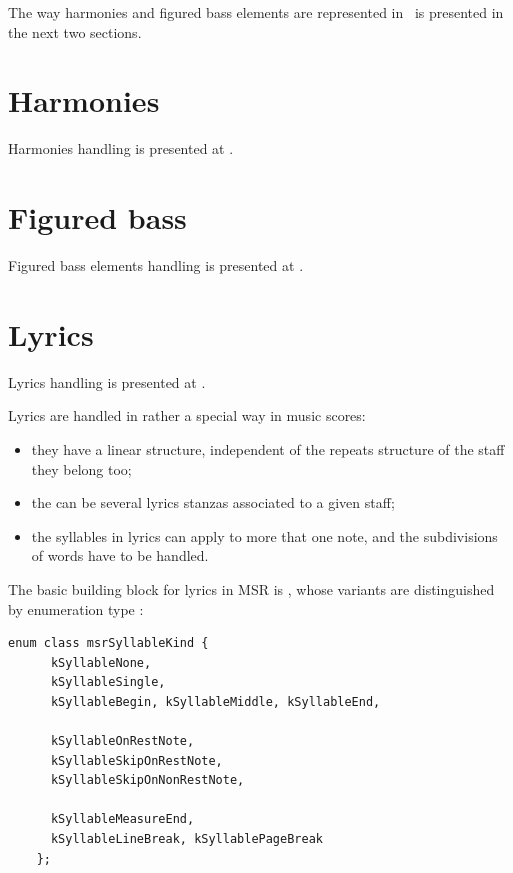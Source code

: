 The way harmonies and figured bass elements are represented in \mf\ is presented in the next two sections.


\section{Harmonies}\label{Harmonies}

Harmonies handling is presented at .


\section{Figured bass}\label{Figured bass}

Figured bass elements handling is presented at .


\section{Lyrics}\label{Lyrics}

Lyrics handling is presented at .

Lyrics are handled in rather a special way in music scores:
\begin{itemize}
\item they have a linear structure, independent of the repeats structure of the staff they belong too;
\item the can be several lyrics stanzas associated to a given staff;
\item the syllables in lyrics can apply to more that one note, and the subdivisions of words have to be handled.
\end{itemize}

The basic building block for lyrics in MSR is , whose variants are distinguished by enumeration type :
\begin{lstlisting}[language=CPlusPlus]
    enum class msrSyllableKind {
      kSyllableNone,
      kSyllableSingle,
      kSyllableBegin, kSyllableMiddle, kSyllableEnd,

      kSyllableOnRestNote,
      kSyllableSkipOnRestNote,
      kSyllableSkipOnNonRestNote,

      kSyllableMeasureEnd,
      kSyllableLineBreak, kSyllablePageBreak
    };
\end{lstlisting}

